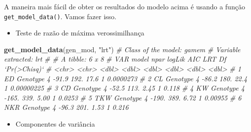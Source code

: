 \documentclass[
]{book}
\newenvironment{Shaded}{\begin{snugshade}}{\end{snugshade}}
\newcommand{\CommentTok}[1]{\textcolor[rgb]{0.56,0.35,0.01}{\textit{#1}}}
\newcommand{\KeywordTok}[1]{\textcolor[rgb]{0.13,0.29,0.53}{\textbf{#1}}}
\newcommand{\NormalTok}[1]{#1}
\newcommand{\StringTok}[1]{\textcolor[rgb]{0.31,0.60,0.02}{#1}}
\providecommand{\tightlist}{%
  \setlength{\itemsep}{0pt}\setlength{\parskip}{0pt}}
\begin{document}
A maneira mais fácil de obter os resultados do modelo acima é usando a função \texttt{get\_model\_data()}. Vamos fazer isso.

\begin{itemize}
\tightlist
\item
  Teste de razão de máxima verossimilhança
\end{itemize}

\begin{Shaded}
\begin{Highlighting}[]
\KeywordTok{get_model_data}\NormalTok{(gen_mod, }\StringTok{"lrt"}\NormalTok{)}
\CommentTok{# Class of the model: gamem}
\CommentTok{# Variable extracted: lrt}
\CommentTok{# # A tibble: 6 x 8}
\CommentTok{#   VAR   model     npar logLik   AIC   LRT    Df `Pr(>Chisq)`}
\CommentTok{#   <chr> <chr>    <dbl>  <dbl> <dbl> <dbl> <dbl>        <dbl>}
\CommentTok{# 1 ED    Genotype     4  -91.9  192. 17.6      1   0.0000273 }
\CommentTok{# 2 CL    Genotype     4  -86.2  180. 22.4      1   0.00000225}
\CommentTok{# 3 CD    Genotype     4  -52.5  113.  2.45     1   0.118     }
\CommentTok{# 4 KW    Genotype     4 -165.   339.  5.00     1   0.0253    }
\CommentTok{# 5 TKW   Genotype     4 -190.   389.  6.72     1   0.00955   }
\CommentTok{# 6 NKR   Genotype     4  -96.3  201.  1.53     1   0.216}
\end{Highlighting}
\end{Shaded}

\begin{itemize}
\tightlist
\item
  Componentes de variância
\end{itemize}

\begin{Shaded}
\end{Shaded}
\end{document}
